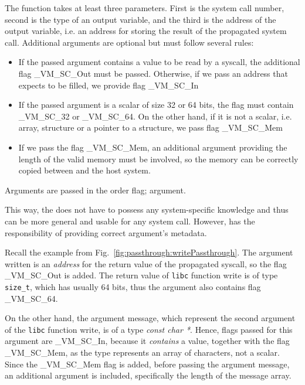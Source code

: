 The function \vmsyscall takes at least three parameters. First is the system call number, second is the type of an output variable, and the third is the address of the output variable, i.e. an address for storing the result of the propagated system call. Additional arguments are optional but must follow several rules:

 \begin{itemize}
     \item If the passed argument contains a value to be read by a syscall, the additional flag \_VM\_SC\_Out must be passed. Otherwise, if we pass an address that expects to be filled, we provide flag \_VM\_SC\_In
 
     \item If the passed argument is a scalar of size 32 or 64 bits, the flag must contain \_VM\_SC\_32 or \_VM\_SC\_64. On the other hand, if it is not a scalar, i.e. array, structure or a pointer to a structure, we pass flag \_VM\_SC\_Mem
     \item If we pass the flag \_VM\_SC\_Mem, an additional argument providing the length of the valid memory must be involved, so the memory can be correctly copied between \divine and the host system. 
 \end{itemize}
 
Arguments are passed in the order flag; argument.

This way, the \vmsyscall does not have to possess any system-specific knowledge and thus can be more general and usable for any system call. However, \dios has the responsibility of providing correct argument's metadata.
  
Recall the example from Fig.~\ref{fig:passthrough:writePassthrough}.
 The argument \textsf{written} is an \textit{address} for the return value of the propagated syscall, so the flag \_VM\_SC\_Out is added. The return value of \texttt{libc} function write is of type \texttt{size\_t}, which has usually 64 bits, thus the argument also contains flag \_VM\_SC\_64.    

On the other hand, the argument \textsf{message}, which represent the second argument of the \texttt{libc} function write, is of a type \textit{const char *}. Hence, flags passed for this argument are \_VM\_SC\_In, because it \textit{contains} a value, together with the flag \_VM\_SC\_Mem, as the type represents an array of characters, not a scalar. Since the  \_VM\_SC\_Mem flag is added, before passing the argument \textsf{message}, an additional argument is included, specifically the length of the \textsf{message} array.

